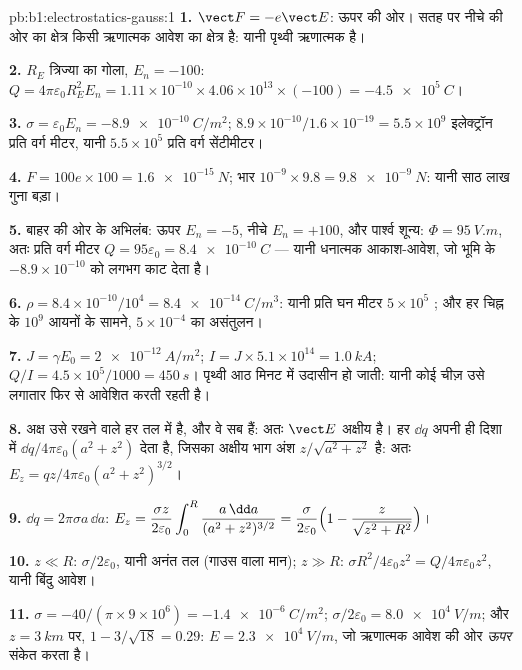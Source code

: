 \begin{solution}{pb:b1:electrostatics-gauss:1}
\textbf{1.} $\vect F = -e\vect E$: ऊपर की ओर। सतह पर नीचे की ओर का क्षेत्र
किसी ऋणात्मक आवेश का क्षेत्र है: यानी पृथ्वी ऋणात्मक है।

\textbf{2.} $R_E$ त्रिज्या का गोला, $E_n = -100$: $Q = 4\pi\varepsilon_0R_E^2E_n =
1.11 \times 10^{-10} \times 4.06 \times 10^{13} \times (-100) = \qty{-4.5e5}{C}$।

\textbf{3.} $\sigma = \varepsilon_0E_n = \qty{-8.9e-10}{C/m^2}$; $8.9 \times 10^{-10}/1.6 \times
10^{-19} = 5.5 \times 10^9$ इलेक्ट्रॉन प्रति वर्ग मीटर, यानी $5.5 \times 10^5$ प्रति
वर्ग सेंटीमीटर।

\textbf{4.} $F = 100e \times 100 = \qty{1.6e-15}{N}$; भार $10^{-9} \times 9.8 =
\qty{9.8e-9}{N}$: यानी साठ लाख गुना बड़ा।

\textbf{5.} बाहर की ओर के अभिलंब: ऊपर $E_n = -5$, नीचे $E_n = +100$, और
पार्श्व शून्य: $\Phi = \qty{95}{V.m}$, अतः प्रति वर्ग मीटर $Q = 95\varepsilon_0 = \qty{+8.4e-10}{C}$
--- यानी धनात्मक आकाश-आवेश, जो भूमि के
$-8.9 \times 10^{-10}$ को लगभग काट देता है।

\textbf{6.} $\rho = 8.4 \times 10^{-10}/10^4 = \qty{8.4e-14}{C/m^3}$: यानी प्रति घन
मीटर $5 \times 10^5$ ; और हर चिह्न के $10^9$ आयनों के सामने,
$5 \times 10^{-4}$ का असंतुलन।

\textbf{7.} $J = \gamma E_0 = \qty{2e-12}{A/m^2}$; $I = J \times 5.1 \times 10^{14} =
\qty{1.0}{kA}$; $Q/I = 4.5 \times 10^5/1000 = \qty{450}{s}$। पृथ्वी आठ मिनट में
उदासीन हो जाती: यानी कोई चीज़ उसे लगातार फिर से आवेशित करती रहती है।

\textbf{8.} अक्ष उसे रखने वाले हर तल में है, और वे सब  हैं: अतः
$\vect E$ अक्षीय है। हर $\dd q$ अपनी ही दिशा में $\dd q/4\pi\varepsilon_0(a^2 + z^2)$
देता है, जिसका अक्षीय भाग अंश
$z/\sqrt{a^2 + z^2}$ है: अतः $E_z = qz/4\pi\varepsilon_0(a^2 + z^2)^{3/2}$।

\textbf{9.} $\dd q = 2\pi\sigma a\,\dd a$: $E_z = \dfrac{\sigma z}{2\varepsilon_0}\displaystyle\int_0^R
\dfrac{a\,\dd a}{(a^2 + z^2)^{3/2}} = \dfrac{\sigma}{2\varepsilon_0}\Bigl(1 - \dfrac{z}{\sqrt{z^2
+ R^2}}\Bigr)$।

\textbf{10.} $z \ll R$: $\sigma/2\varepsilon_0$, यानी अनंत तल (गाउस वाला मान);
$z \gg R$: $\sigma R^2/4\varepsilon_0z^2 = Q/4\pi\varepsilon_0z^2$, यानी बिंदु आवेश।

\textbf{11.} $\sigma = -40/(\pi \times 9 \times 10^6) = \qty{-1.4e-6}{C/m^2}$; $\sigma/2\varepsilon_0 =
\qty{8.0e4}{V/m}$; और $z = \qty{3}{km}$ पर, $1 - 3/\sqrt{18} = 0.29$: $E =
\qty{2.3e4}{V/m}$, जो ऋणात्मक आवेश की ओर \emph{ऊपर} संकेत करता है।


\end{solution}
